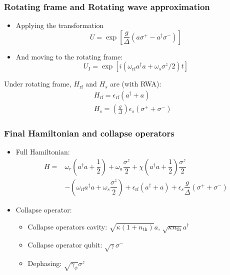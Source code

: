 \documentclass[xcolor=dvipsnames,hyperref={CJKbookmarks=true}]{beamer}
\newcommand{\rf}{\text{rf}}
\newcommand{\thm}{\text{th}}
\begin{document}
\begin{frame}
\frametitle{Rotating frame and Rotating wave approximation}
\begin{itemize}
\item Applying the transformation
$$U=\exp\left[\dfrac{g}{\Delta}\left(a\sigma^{+}-a^{\dagger}\sigma^{-} \right)\right]$$
\item And moving to the rotating frame:
$$U_I=\exp\left[i\left(\omega_{\rf}a^{\dagger}a +\omega_s\sigma^{z}/2 \right)t\right]$$
\end{itemize}
Under rotating frame, $H_{\rf}$ and $H_{s}$ are (with RWA):
\begin{align*}
	&H_{\rf} = \epsilon_{\rf}\left(a^{\dagger}+a\right) \\
	&H_{s} = \left(\frac{g}{\Delta}\right)\epsilon_{s}\left(\sigma^{+}+\sigma^{-} \right)
\end{align*}
\end{frame}

\begin{frame}
\frametitle{Final Hamiltonian and collapse operators}
\begin{itemize}
	\item Full Hamiltonian: 
\begin{align*}
H =& \omega_r \left(a^{\dagger} a+ \dfrac{1}{2} \right) +  \omega_a \dfrac{\sigma^{z}}{2}+ \chi \left(a^{\dagger}a+\dfrac{1}{2} \right)\dfrac{\sigma^{z}}{2}\\
& - \left( \omega_{\rf}a^{\dagger}a +\omega_s \dfrac{\sigma^{z}}{2} \right) + \epsilon_{\rf}\left(a^{\dagger}+a\right) 
+  \epsilon_{s}\dfrac{g}{\Delta}\left(\sigma^{+}+\sigma^{-} \right)
\end{align*}
	\item Collapse operator: 
	\begin{itemize}
		\item  Collapse operators cavity: 
		$\sqrt{\kappa \left(1+n_{\thm} \right)}a$, 
		$\sqrt{\kappa n_{\thm} }a^{\dagger}$
		\item Collapse operator qubit:  
		$\sqrt{\gamma}\sigma^{-}$
		\item Dephasing: 
		$\sqrt{\gamma_{\phi}}\sigma^{z}$
	\end{itemize}
\end{itemize}
\end{frame}

\end{document}
